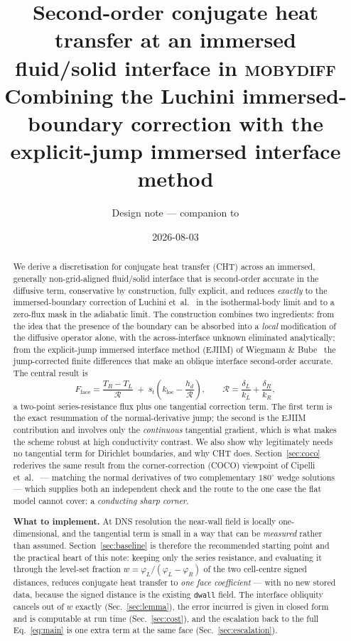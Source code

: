 \documentclass[11pt,a4paper]{article}
\title{Second-order conjugate heat transfer at an immersed\\
       fluid/solid interface in \textsc{mobydiff}\\[2mm]
       \large Combining the Luchini immersed-boundary correction with the\\
       explicit-jump immersed interface method}
\author{Design note --- companion to \code{docs/next\_session\_conjugate.md}}
\date{2026-08-03}
\newcommand{\Rser}{\mathcal{R}}
\newcommand{\code}[1]{\texttt{#1}}
\begin{document}
\maketitle

\begin{abstract}
\noindent
We derive a discretisation for conjugate heat transfer (CHT) across an immersed,
generally non-grid-aligned fluid/solid interface that is second-order accurate in
the diffusive term, conservative by construction, fully explicit, and reduces
\emph{exactly} to the immersed-boundary correction of Luchini
et~al.~\cite{luchini2025} in the isothermal-body limit and to a zero-flux mask in
the adiabatic limit. The construction combines two ingredients: from
\cite{luchini2025} the idea that the presence of the boundary can be absorbed
into a \emph{local} modification of the diffusive operator alone, with the
across-interface unknown eliminated analytically; from the explicit-jump immersed
interface method (EJIIM) of Wiegmann \& Bube~\cite{ejiim2000} the jump-corrected
finite differences that make an oblique interface second-order accurate. The
central result is
\begin{equation*}
  F_{\text{face}}
   = \frac{T_R-T_L}{\Rser} \;+\; s_t\left(k_{\text{loc}}-\frac{h_d}{\Rser}\right),
  \qquad
  \Rser = \frac{\delta_L}{k_L}+\frac{\delta_R}{k_R},
\end{equation*}
a two-point series-resistance flux plus one tangential correction term. The
first term is the exact resummation of the normal-derivative jump; the second is
the EJIIM contribution and involves only the \emph{continuous} tangential
gradient, which is what makes the scheme robust at high conductivity contrast.
We also show why \cite{luchini2025} legitimately needs no tangential term for
Dirichlet boundaries, and why CHT does. Section~\ref{sec:coco} rederives the
same result from the corner-correction (COCO) viewpoint of Cipelli
et~al.~\cite{cipelli2025} --- matching the normal derivatives of two
complementary $180^\circ$ wedge solutions --- which supplies both an
independent check and the route to the one case the flat model cannot cover:
a \emph{conducting sharp corner}.

\medskip\noindent
\textbf{What to implement.} At DNS resolution the near-wall field is locally
one-dimensional, and the tangential term is small in a way that can be
\emph{measured} rather than assumed. Section~\ref{sec:baseline} is therefore the
recommended starting point and the practical heart of this note: keeping only
the series resistance, and evaluating it through the level-set fraction
$w=\varphi_L/(\varphi_L-\varphi_R)$ of the two cell-centre signed distances,
reduces conjugate heat transfer to \emph{one face coefficient} --- with no new
stored data, because the signed distance is the existing \code{dwall} field. The
interface obliquity cancels out of $w$ exactly (Sec.~\ref{sec:lemma}), the
error incurred is given in closed form and is computable at run time
(Sec.~\ref{sec:cost}), and the escalation back to the full
Eq.~\eqref{eq:main} is one extra term at the same face
(Sec.~\ref{sec:escalation}).
\end{abstract}
\end{document}
